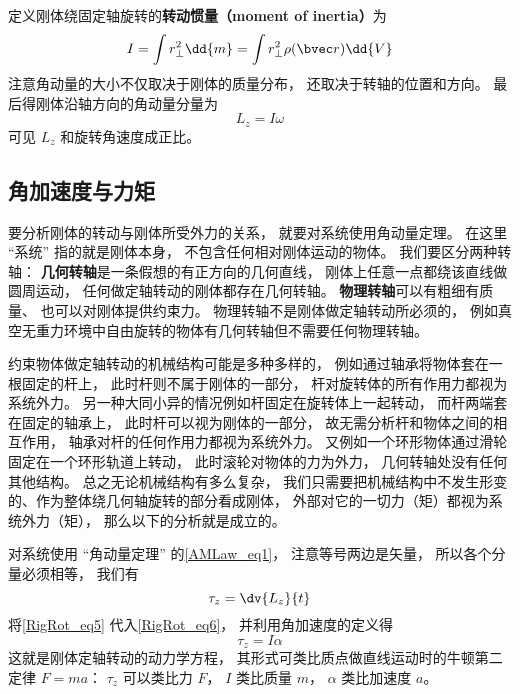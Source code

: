 定义刚体绕固定轴旋转的\textbf{转动惯量（moment of inertia）}为
\begin{equation}
I = \int r_ \bot ^2 \dd{m} = \int r_ \bot ^2\rho(\bvec r) \dd{V} 
\end{equation}
注意角动量的大小不仅取决于刚体的质量分布， 还取决于转轴的位置和方向。 最后得刚体沿轴方向的角动量分量为
\begin{equation}\label{RigRot_eq5}
L_z = I \omega 
\end{equation}
可见 $L_z$ 和旋转角速度成正比。

\subsection{角加速度与力矩}
要分析刚体的转动与刚体所受外力的关系， 就要对系统使用角动量定理。 在这里 “系统” 指的就是刚体本身， 不包含任何相对刚体运动的物体。 我们要区分两种转轴： \textbf{几何转轴}是一条假想的有正方向的几何直线， 刚体上任意一点都绕该直线做圆周运动， 任何做定轴转动的刚体都存在几何转轴。 \textbf{物理转轴}可以有粗细有质量、 也可以对刚体提供约束力。 物理转轴不是刚体做定轴转动所必须的， 例如真空无重力环境中自由旋转的物体有几何转轴但不需要任何物理转轴。

约束物体做定轴转动的机械结构可能是多种多样的， 例如通过轴承将物体套在一根固定的杆上， 此时杆则不属于刚体的一部分， 杆对旋转体的所有作用力都视为系统外力。 另一种大同小异的情况例如杆固定在旋转体上一起转动， 而杆两端套在固定的轴承上， 此时杆可以视为刚体的一部分， 故无需分析杆和物体之间的相互作用， 轴承对杆的任何作用力都视为系统外力。 又例如一个环形物体通过滑轮固定在一个环形轨道上转动， 此时滚轮对物体的力为外力， 几何转轴处没有任何其他结构。 总之无论机械结构有多么复杂， 我们只需要把机械结构中不发生形变的、作为整体绕几何轴旋转的部分看成刚体， 外部对它的一切力（矩）都视为系统外力（矩）， 那么以下的分析就是成立的。

对系统使用 “角动量定理” 的\autoref{AMLaw_eq1}， 注意等号两边是矢量， 所以各个分量必须相等， 我们有
\begin{equation}\label{RigRot_eq6}
\tau_z = \dv{L_z}{t}
\end{equation}
将\autoref{RigRot_eq5} 代入\autoref{RigRot_eq6}， 并利用角加速度的定义得
\begin{equation}\label{RigRot_eq7}
\tau_z = I\alpha
\end{equation}
这就是刚体定轴转动的动力学方程， 其形式可类比质点做直线运动时的牛顿第二定律 $F = ma$： $\tau_z$ 可以类比力 $F$， $I$ 类比质量 $m$， $\alpha$ 类比加速度 $a$。


